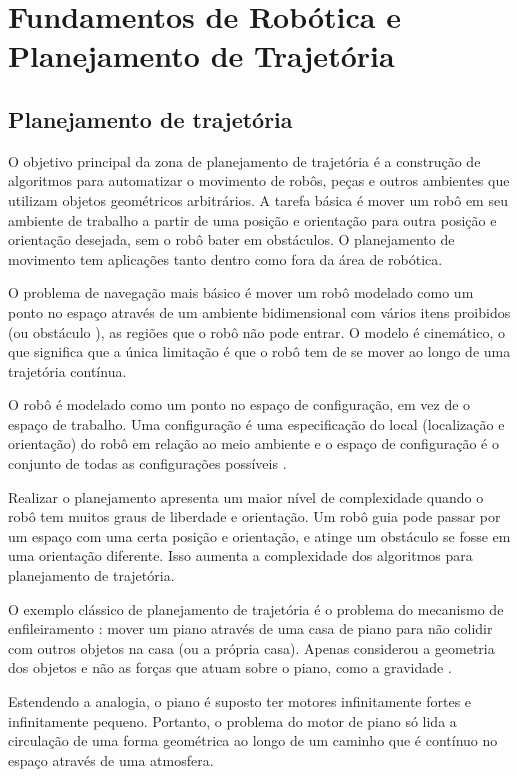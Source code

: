 \chapter{Fundamentos de Robótica e Planejamento de Trajetória}
\label{chap:fundam}

\section{Planejamento de trajet\'oria}

O objetivo principal da zona de planejamento de trajetória é a construção de algoritmos para automatizar o movimento de robôs, 
peças e outros ambientes que utilizam objetos geométricos arbitrários. A tarefa básica é mover um robô em seu ambiente de trabalho 
a partir de uma posição e orientação para outra posição e orientação desejada, sem o robô bater em obstáculos. O planejamento de 
movimento tem aplicações tanto dentro como fora da área de robótica.

O problema de navegação mais básico é mover um robô modelado como um ponto no espaço através de um ambiente bidimensional com vários
itens proibidos (ou obstáculo ), as regiões que o robô não pode entrar. O modelo é cinemático, o que significa que a única limitação
é que o robô tem de se mover ao longo de uma trajetória contínua.

O robô é modelado como um ponto no espaço de configuração, em vez de o espaço de trabalho. Uma configuração é uma especificação
do local (localização e orientação) do robô em relação ao meio ambiente e o espaço de configuração é o conjunto de todas as configurações
possíveis \cite{achoset}.

Realizar o planejamento apresenta um maior nível de complexidade quando o robô tem muitos graus de liberdade e orientação. Um robô 
guia pode passar por um espaço com uma certa posição e orientação, e atinge um obstáculo se fosse em uma orientação diferente. Isso 
aumenta a complexidade dos algoritmos para planejamento de trajetória.

O exemplo clássico de planejamento de trajetória é o problema do mecanismo de enfileiramento \cite{bsharir}: 
mover um piano através de uma casa de piano para não colidir com outros objetos na casa (ou a própria casa). Apenas considerou a 
geometria dos objetos e não as forças que atuam sobre o piano, como a gravidade .

Estendendo a analogia, o piano é suposto ter motores infinitamente fortes e infinitamente pequeno. Portanto, o problema do motor 
de piano só lida a circulação de uma forma geométrica ao longo de um caminho que é contínuo no espaço através de uma atmosfera.


